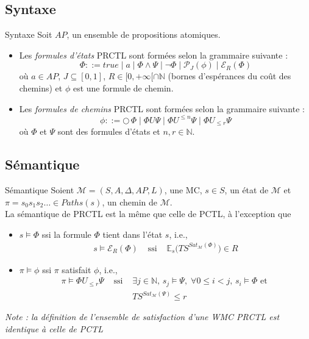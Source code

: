 \documentclass[compress]{beamer}
\begin{document}
\subsection{Syntaxe}
\begin{frame}{}
  \small
  \begin{block}{Syntaxe}
    Soit $AP$, un ensemble de propositions atomiques.
    \begin{itemize}
      \item Les \textit{\color{fibeamer@orange}formules d'états} PRCTL sont formées selon la
    grammaire suivante :
    \[
      \Phi ::= true \; | \; a \; | \; \Phi \wedge \Psi \; | \; \neg \Phi \; | \; \mathcal{P}_J(\phi) \; | \; \mathcal{E}_R (\Phi)
    \]
    où $a \in AP$, $J \subseteq [0, 1]$, $R \in [0, +\infty[ \cap \mathbb{N}$ (bornes d'espérances du coût des chemins) et $\phi$ est une formule de chemin.
      \item Les \textit{\color{fibeamer@orange}formules de chemins} PRCTL sont formées selon la grammaire suivante :
      \[
        \phi ::= \bigcirc\,\Phi \; | \; \Phi U \Psi \; | \; \Phi U^{\leq n} \Psi
        \; | \; \Phi U_{\leq r} \Psi
      \]
      où $\Phi$ et $\Psi$ sont des formules d'états et $n, r \in \mathbb{N}$.
    \end{itemize}
  \end{block}
\end{frame}

\subsection{Sémantique}
\begin{frame}{Sémantique}
\small
Soient $\mathcal{M} = (S, A, \Delta, AP, L)$, une MC, $s \in S$, un {\color{fibeamer@orange}état}
  de $\mathcal{M}$ et $\pi = s_0s_1s_2\dots \in Paths(s)$, un {\color{fibeamer@orange}chemin} de $\mathcal{M}$.\\
La sémantique de PRCTL est la même que celle de PCTL, à l'exception que
\begin{itemize}
  \item $s \models \Phi$ ssi la formule $\Phi$ tient dans l'état $s$, i.e.,
    \begin{align*}
      & s \models \mathcal{E}_R(\Phi) & \text{ ssi } & \mathbb{E}_s\big(TS^{Sat_\mathcal{M}(\Phi)}\big) \in R&
    \end{align*}
  \item $\pi \models \phi$ ssi $\pi$ satisfait $\phi$, i.e.,
  \begin{align*}
  &\pi \models \Phi U_{\leq r} \Psi &\text{ ssi }& \exists j \in \mathbb{N} ,\, s_j \models \Psi
    , \;  \forall 0 \leq i < j, \, s_i \models \Phi \text{ et }&\\
  & & & TS^{Sat_\mathcal{M}(\Psi)} \leq r &
  \end{align*}
\end{itemize}
\textit{\color{gray}Note : la définition de l'ensemble de satisfaction d'une WMC PRCTL est identique à celle de PCTL}
\end{frame}
\end{document}
